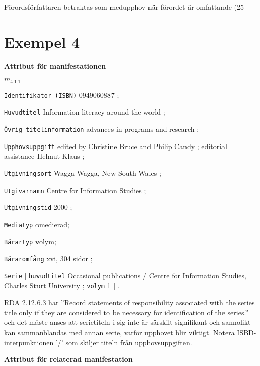 \documentclass[a4,12pt]{article}
\begin{document}
\vspace{3mm}

\noindent 

Förordsförfattaren betraktas som medupphov när förordet är omfattande (25%






\newpage

\section{Exempel 4}
\label{sec:ex4}


\textbf{Attribut för manifestationen}

\noindent $m_{4.1.1}$

 \texttt{Identifikator (ISBN)} 0949060887 ;

 \texttt{Huvudtitel} Information literacy around the world ;
 
\texttt{Övrig titelinformation} advances in
programs and research ;

\texttt{Upphovsuppgift} edited by Christine Bruce and Philip
Candy ; editorial assistance Helmut Klaus ;

 \texttt{Utgivningsort} Wagga Wagga, New South Wales ;

 \texttt{Utgivarnamn} Centre for Information Studies ;

 \texttt{Utgivningstid} 2000 ;
 
  \texttt{Mediatyp}  omedierad;
 
 \texttt{Bärartyp}  volym;

\texttt{Bäraromfång} xvi, 304 sidor ;

\texttt{Serie} [ \texttt{huvudtitel} Occasional publications / Centre for Information Studies,
Charles Sturt University ; \texttt{volym} 1 ] .

\vspace{3mm}

RDA 2.12.6.3 har ''Record statements of responsibility associated with
the series title only if they are considered to be necessary for
identification of the series.'' och det måste anses att serietiteln i
sig inte är särskilt signifikant och sannolikt kan sammanblandas med
annan serie, varför upphovet blir viktigt. Notera ISBD-interpunktionen
'/' som skiljer titeln från upphovsuppgiften. 


\vspace{3mm}



\textbf{Attribut för relaterad manifestation}
\end{document}
